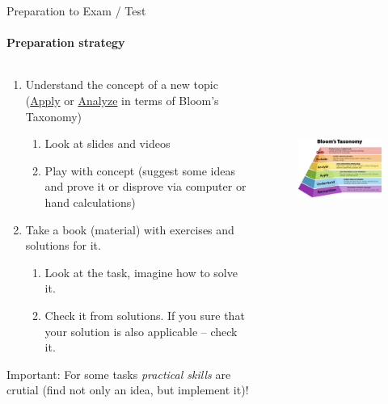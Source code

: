 \documentclass[aspectratio=169,notes]{beamer}
\begin{document}
\begin{frame}[t]{Preparation to Exam / Test}
\framesubtitle{Preparation strategy}
\vspace{-0.7cm}
\begin{columns}[T,onlytextwidth]
    \begin{column}{0.59\textwidth}
        \begin{enumerate}
            \item Understand the concept of a new topic \\ (\underline{Apply} or \underline{Analyze} in terms of Bloom's Taxonomy)
            \begin{enumerate}
                \item Look at slides and videos
                \item Play with concept (suggest some ideas and prove it or disprove via computer or hand calculations)
            \end{enumerate}
            \item Take a book (material) with exercises and solutions for it. \begin{enumerate}
                \item Look at the task, imagine how to solve it.
                \item Check it from solutions. If you sure that your solution is also applicable – check it.
            \end{enumerate} 
        \end{enumerate}
        \alert{Important}: For some tasks \textit{practical skills} are crutial (find not only an idea, but implement it)!
    \end{column}
    \begin{column}{0.39\textwidth}
        \begin{figure}[H]
            \centering\includegraphics[height=6cm,width=1\textwidth,keepaspectratio]{bloom_taxonomy.png}
            \label{fig:bloom_taxonomy.png}
        \end{figure}
    \end{column}
\end{columns}
\end{frame}
\end{document}
